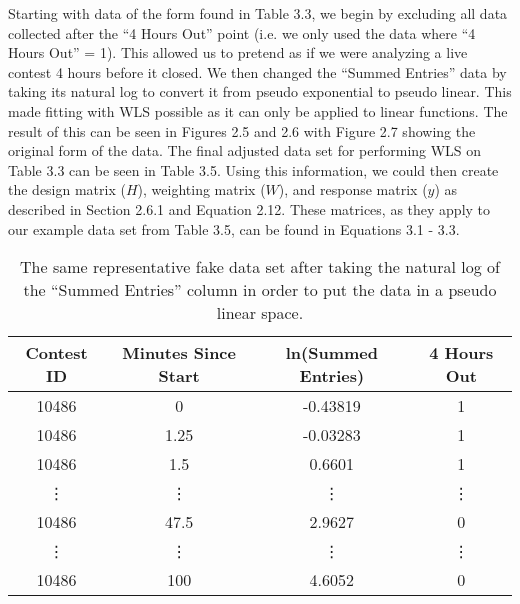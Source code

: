 Starting with data of the form found in Table 3.3, we begin by excluding all data collected after the ``4 Hours Out'' point (i.e. we only used the data where ``4 Hours Out'' = 1). This allowed us to pretend as if we were analyzing a live contest 4 hours before it closed. We then changed the ``Summed Entries'' data by taking its natural log to convert it from pseudo exponential to pseudo linear. This made fitting with WLS possible as it can only be applied to linear functions. The result of this can be seen in Figures 2.5 and 2.6 with Figure 2.7 showing the original form of the data. The final adjusted data set for performing WLS on Table 3.3 can be seen in Table 3.5. Using this information, we could then create the design matrix ($H$), weighting matrix ($W$), and response matrix ($y$) as described in Section 2.6.1 and Equation 2.12. These matrices, as they apply to our example data set from Table 3.5, can be found in Equations 3.1 - 3.3.

\begin{table}
\begin{center}
\begin{tabular}{| c | c | c | c |}
\hline
 \textbf{Contest ID} & \textbf{Minutes Since Start} & \textbf{ln(Summed Entries)} & \textbf{4 Hours Out} \\ 
 \hline
 10486 & 0 & -0.43819 & 1 \\  
 \hline
 10486 & 1.25 & -0.03283 & 1 \\
 \hline
 10486 & 1.5 & 0.6601 & 1 \\
 \hline
 \vdots & \vdots & \vdots & \vdots \\
 \hline
 10486 & 47.5 & 2.9627 & 0 \\
 \hline
 \vdots & \vdots & \vdots & \vdots \\
 \hline
 10486 & 100 & 4.6052 & 0 \\
 \hline
\end{tabular}
\caption[Sample Data After a Log Transformation]{The same representative fake data set after taking the natural log of the ``Summed Entries'' column in order to put the data in a pseudo linear space.}
\end{center}
\end{table}

